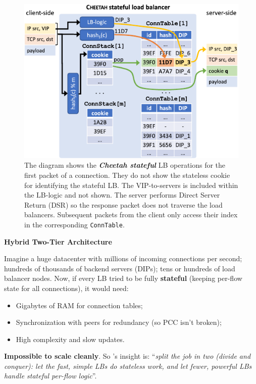 \newpage

\begin{figure}[!htp]
    \centering
    \includegraphics[width=\textwidth]{img/statefull-cheetah.pdf}
    \caption{The diagram \cite{barbette2020high} shows the \textbf{\emph{Cheetah stateful}} LB operations for the first packet of a connection. They do not show the stateless cookie for identifying the stateful LB. The VIP-to-servers is included within the LB-logic and not shown. The server performs Direct Server Return (DSR) so the response packet does not traverse the load balancers. Subsequent packets from the client only access their index in the corresponding \texttt{ConnTable}.}
\end{figure}

\begin{flushleft}
    \textcolor{Green3}{ \textbf{Hybrid Two-Tier Architecture}}
\end{flushleft}
Imagine a huge datacenter with millions of incoming connections per second; hundreds of thousands of backend servers (DIPs); tens or hundreds of load balancer nodes. Now, if every LB tried to be fully \textbf{stateful} (keeping per-flow state for all connections), it would need:
\begin{itemize}
    \item Gigabytes of RAM for connection tables;
    \item Synchronization with peers for redundancy (so PCC isn't broken);
    \item High complexity and slow updates.
\end{itemize}
\textbf{Impossible to scale cleanly}. So 's insight is: ``\emph{split the job in two (divide and conquer): let the fast, simple LBs do stateless work, and let fewer, powerful LBs handle stateful per-flow logic}''.

